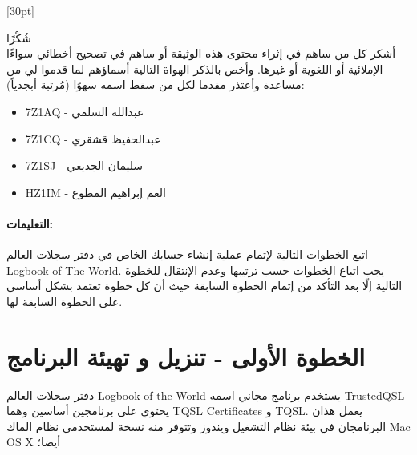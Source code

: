 \documentclass[a4paper,12pt]{article}
\newenvironment{dedication}
{
   \cleardoublepage
   \thispagestyle{plain}
   \vspace*{\stretch{1}}
	\hfill\begin{minipage}[t]{0.66\textwidth}
   \raggedleft
}%
{
   \end{minipage}
   \vspace*{\stretch{3}}
	\begin{center}
		\color{slategray2}
	{\Huge\decoone}
	\end{center}
   \clearpage
}
\begin{document}


\newpage
\tableofcontents
\newpage

	

\begin{dedication}
	\hspace{-185pt}\vspace{-14pt}\marginnote{\fontsize{200}{60}\selectfont\aldineright}[30pt]
	
	{\Huge{شُكْرًا\\}}
	\vspace{14pt}
	أشكر كل من ساهم في إثراء محتوى هذه الوثيقة أو ساهم في تصحيح أخطائي سواءًا الإملائية أو اللغوية أو غيرها. وأخص بالذكر الهواة التالية أسماؤهم لما قدموا لي من مساعدة وأعتذر مقدما لكل من سقط اسمه سهوًا (مُرتبة أبجدياً):
	\begin{itemize}
		\item
			7Z1AQ - عبدالله السلمي
		\item
			7Z1CQ - عبدالحفيظ قشقري
		\item
			7Z1SJ - سليمان الجديعي
		\item
			HZ1IM - العم إبراهيم المطوع
	\end{itemize}
\end{dedication}


\paragraph{التعليمات:}

اتبع الخطوات التالية لإتمام عملية إنشاء حسابك الخاص في دفتر سجلات العالم 
\textenglish{Logbook of The World}.
يجب اتباع الخطوات حسب ترتيبها وعدم الإنتقال للخطوة التالية إلّا بعد التأكد من إتمام الخطوة السابقة حيث أن كل خطوة تعتمد بشكل أساسي على الخطوة السابقة لها.

\vspace{18pt}
\begin{center}
	\color{slategray2}
{\Huge\decoone}
\end{center}

\section{الخطوة الأولى - تنزيل و تهيئة البرنامج}

دفتر سجلات العالم \textenglish{Logbook of the World} يستخدم برنامج مجاني اسمه \textenglish{TrustedQSL} يحتوي على برنامجين أساسين وهما
\textenglish{TQSL Certificates} و \textenglish{TQSL}. يعمل هذان البرنامجان في بيئة نظام التشغيل
ويندوز وتتوفر منه نسخة لمستخدمي نظام الماك \textenglish{Mac OS X} أيضا؛
\end{document}
